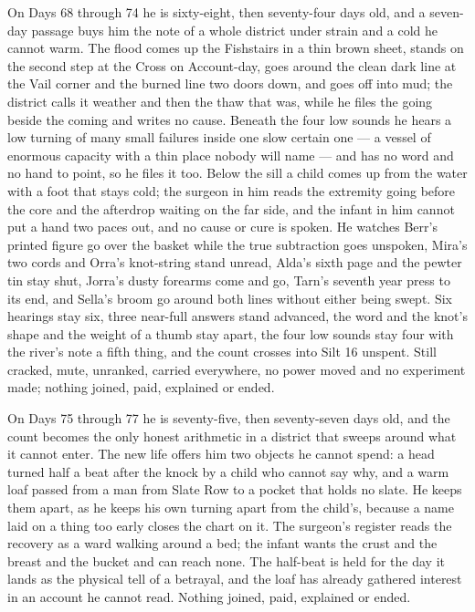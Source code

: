 \documentclass{design/chronicle}
\begin{document}
{On Days 68 through 74 he is sixty-eight, then seventy-four days old, and a seven-day passage buys him the note of a whole district under strain and a cold he cannot warm. The flood comes up the Fishstairs in a thin brown sheet, stands on the second step at the Cross on Account-day, goes around the clean dark line at the Vail corner and the burned line two doors down, and goes off into mud; the district calls it weather and then the thaw that was, while he files the going beside the coming and writes no cause. Beneath the four low sounds he hears a low turning of many small failures inside one slow certain one --- a vessel of enormous capacity with a thin place nobody will name --- and has no word and no hand to point, so he files it too. Below the sill a child comes up from the water with a foot that stays cold; the surgeon in him reads the extremity going before the core and the afterdrop waiting on the far side, and the infant in him cannot put a hand two paces out, and no cause or cure is spoken. He watches Berr’s printed figure go over the basket while the true subtraction goes unspoken, Mira’s two cords and Orra’s knot-string stand unread, Alda’s sixth page and the pewter tin stay shut, Jorra’s dusty forearms come and go, Tarn’s seventh year press to its end, and Sella’s broom go around both lines without either being swept. Six hearings stay six, three near-full answers stand advanced, the word and the knot’s shape and the weight of a thumb stay apart, the four low sounds stay four with the river’s note a fifth thing, and the count crosses into Silt 16 unspent. Still cracked, mute, unranked, carried everywhere, no power moved and no experiment made; nothing joined, paid, explained or ended.

On Days 75 through 77 he is seventy-five, then seventy-seven days old, and the count becomes the only honest arithmetic in a district that sweeps around what it cannot enter. The new life offers him two objects he cannot spend: a head turned half a beat after the knock by a child who cannot say why, and a warm loaf passed from a man from Slate Row to a pocket that holds no slate. He keeps them apart, as he keeps his own turning apart from the child’s, because a name laid on a thing too early closes the chart on it. The surgeon’s register reads the recovery as a ward walking around a bed; the infant wants the crust and the breast and the bucket and can reach none. The half-beat is held for the day it lands as the physical tell of a betrayal, and the loaf has already gathered interest in an account he cannot read. Nothing joined, paid, explained or ended.

}
\end{document}
